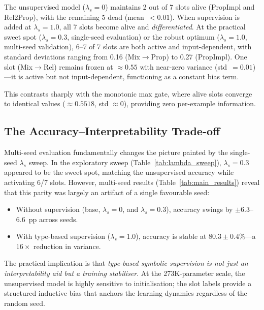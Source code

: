 \documentclass[conference]{IEEEtran}
\begin{document}
The unsupervised model ($\lambda_s{=}0$) maintains 2 out of 7
slots alive (PropImpl and Rel2Prop), with the remaining 5 dead
(mean~$< 0.01$).  When supervision is added at $\lambda_s{=}1.0$,
all 7 slots become alive and \emph{differentiated}.
At the practical sweet spot ($\lambda_s{=}0.3$, single-seed
evaluation) or the robust optimum ($\lambda_s{=}1.0$,
multi-seed validation), 6--7 of 7 slots
are both active and input-dependent, with standard deviations
ranging from 0.16 (Mix$\to$Prop) to 0.27 (PropImpl).
One slot (Mix$\to$Rel) remains frozen at $\approx 0.55$
with near-zero variance (std~$= 0.01$)---it is active but not
input-dependent, functioning as a constant bias term.

This contrasts sharply with the monotonic max gate, where alive
slots converge to identical values ($\approx 0.5518$, std
$\approx 0$), providing zero per-example information.

\subsection{The Accuracy--Interpretability Trade-off}
\label{sec:tradeoff}

Multi-seed evaluation fundamentally changes the picture painted
by the single-seed $\lambda_s$ sweep.  In the exploratory sweep
(Table~\ref{tab:lambda_sweep}), $\lambda_s{=}0.3$ appeared to be
the sweet spot, matching the unsupervised accuracy while
activating 6/7 slots.  However, multi-seed results
(Table~\ref{tab:main_results}) reveal that this parity was
largely an artifact of a single favourable seed:

\begin{itemize}[nosep]
    \item Without supervision (base, $\lambda_s{=}0$, and
          $\lambda_s{=}0.3$), accuracy swings by
          $\pm 6.3$--$6.6$~pp across seeds.
    \item With type-based supervision ($\lambda_s{=}1.0$),
          accuracy is stable at $80.3 \pm 0.4\%$---a
          $16\times$ reduction in variance.
\end{itemize}

The practical implication is that \emph{type-based symbolic
supervision is not just an interpretability aid but a training
stabiliser}.  At the 273K-parameter scale, the unsupervised
model is highly sensitive to initialisation; the slot labels
provide a structured inductive bias that anchors the learning
dynamics regardless of the random seed.
\end{document}
